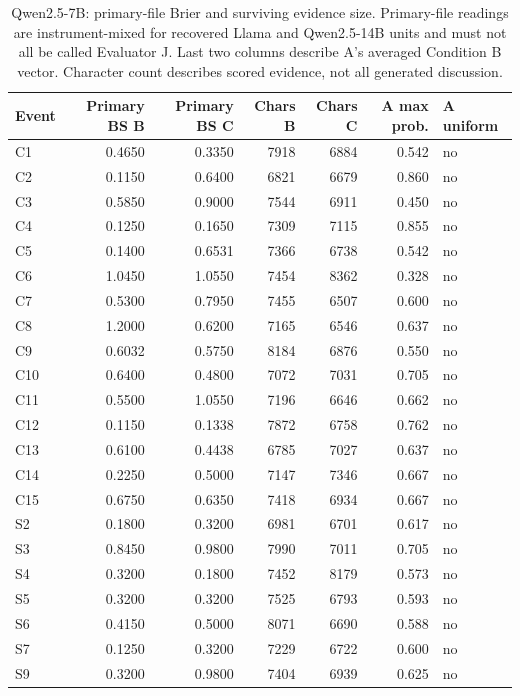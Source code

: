 \begin{table}[!htbp]
\centering\small
\caption{Qwen2.5-7B: primary-file Brier and surviving evidence size. Primary-file readings are instrument-mixed for recovered Llama and Qwen2.5-14B units and must not all be called Evaluator J. Last two columns describe A's averaged Condition B vector. Character count describes scored evidence, not all generated discussion.}
\label{tab:full_primary_qwen257b}
\begin{tabular}{lrrrrrl}
\toprule
Event & Primary BS B & Primary BS C & Chars B & Chars C & A max prob. & A uniform \\
\midrule
C1 & 0.4650 & 0.3350 & 7918 & 6884 & 0.542 & no \\
C2 & 0.1150 & 0.6400 & 6821 & 6679 & 0.860 & no \\
C3 & 0.5850 & 0.9000 & 7544 & 6911 & 0.450 & no \\
C4 & 0.1250 & 0.1650 & 7309 & 7115 & 0.855 & no \\
C5 & 0.1400 & 0.6531 & 7366 & 6738 & 0.542 & no \\
C6 & 1.0450 & 1.0550 & 7454 & 8362 & 0.328 & no \\
C7 & 0.5300 & 0.7950 & 7455 & 6507 & 0.600 & no \\
C8 & 1.2000 & 0.6200 & 7165 & 6546 & 0.637 & no \\
C9 & 0.6032 & 0.5750 & 8184 & 6876 & 0.550 & no \\
C10 & 0.6400 & 0.4800 & 7072 & 7031 & 0.705 & no \\
C11 & 0.5500 & 1.0550 & 7196 & 6646 & 0.662 & no \\
C12 & 0.1150 & 0.1338 & 7872 & 6758 & 0.762 & no \\
C13 & 0.6100 & 0.4438 & 6785 & 7027 & 0.637 & no \\
C14 & 0.2250 & 0.5000 & 7147 & 7346 & 0.667 & no \\
C15 & 0.6750 & 0.6350 & 7418 & 6934 & 0.667 & no \\
S2 & 0.1800 & 0.3200 & 6981 & 6701 & 0.617 & no \\
S3 & 0.8450 & 0.9800 & 7990 & 7011 & 0.705 & no \\
S4 & 0.3200 & 0.1800 & 7452 & 8179 & 0.573 & no \\
S5 & 0.3200 & 0.3200 & 7525 & 6793 & 0.593 & no \\
S6 & 0.4150 & 0.5000 & 8071 & 6690 & 0.588 & no \\
S7 & 0.1250 & 0.3200 & 7229 & 6722 & 0.600 & no \\
S9 & 0.3200 & 0.9800 & 7404 & 6939 & 0.625 & no \\

\end{tabular}
\end{table}
